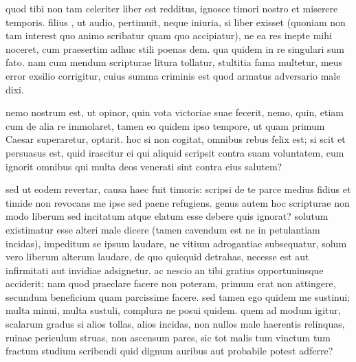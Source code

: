


 quod tibi non tam celeriter liber est redditus, ignosce timori nostro et miserere temporis. filius , ut audio, pertimuit, neque iniuria, si liber exisset (quoniam non tam interest quo animo scribatur quam quo accipiatur), ne ea res inepte mihi noceret, cum praesertim adhuc stili poenas dem. qua quidem in re singulari sum fato. nam cum mendum scripturae litura tollatur, stultitia fama multetur, meus error exsilio corrigitur, cuius summa criminis est quod armatus adversario male dixi.

 nemo nostrum est, ut opinor, quin vota victoriae suae fecerit, nemo, quin, etiam cum de alia re immolaret, tamen eo quidem ipso tempore, ut quam primum Caesar superaretur, optarit. hoc si non cogitat, omnibus rebus felix est; si scit et persuasus est, quid irascitur ei qui aliquid scripsit contra suam voluntatem, cum ignorit omnibus qui multa deos venerati sint contra eius salutem?

 sed ut eodem revertar, causa haec fuit timoris: scripsi de te parce medius fidius et timide non revocans me ipse sed paene refugiens. genus autem hoc scripturae non modo liberum sed incitatum atque elatum esse debere quis ignorat? solutum existimatur esse alteri male dicere (tamen cavendum est ne in petulantiam incidas), impeditum se ipsum laudare, ne vitium adrogantiae subsequatur, solum vero liberum alterum laudare, de quo quicquid detrahas, necesse est aut infirmitati aut invidiae adsignetur. ac nescio an tibi gratius opportuniusque acciderit; nam quod praeclare facere non poteram, primum erat non attingere, secundum beneficium quam parcissime facere. sed tamen ego quidem me sustinui; multa minui, multa sustuli, complura ne posui quidem. quem ad modum igitur, scalarum gradus si alios tollas, alios incidas, non nullos male haerentis relinquas, ruinae periculum struas, non ascensum pares, sic tot malis tum vinctum tum fractum studium scribendi quid dignum auribus aut probabile potest adferre?

